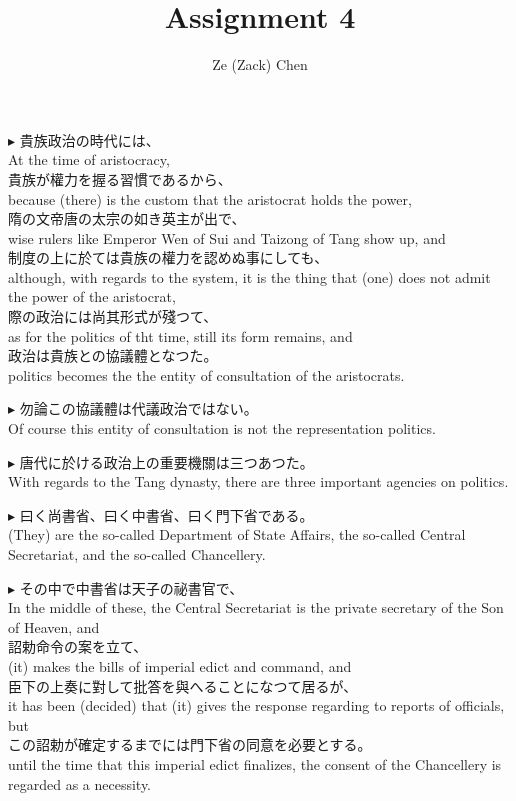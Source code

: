 \documentclass{ctexart}
\title{Assignment 4}
\author{Ze (Zack) Chen}
\makeatletter
\newcommand*{\shifttext}[1]{%
  \settowidth{\@tempdima}{#1}%
  \hspace{-\@tempdima}#1%
}
\newcommand{\plabel}[1]{%
\shifttext{\textbf{#1}\quad}%
}
\newcommand{\prule}{%
\begin{center}%
\hdashrule[0.5ex]{.99\linewidth}{1pt}{1pt 2.5pt}%
\end{center}%
}
\makeatother
\begin{document}
\maketitle

\plabel{$\blacktriangleright$}%
貴族政治の時代には、\\
At the time of aristocracy,\\
貴族が權力を握る習慣であるから、\\
because (there) is the custom that the aristocrat holds the power,\\
隋の文帝\textperiodcentered 唐の太宗の如き英主が出で、\\
wise rulers like Emperor Wen of Sui and Taizong of Tang show up, and\\
制度の上に於ては貴族の權力を認めぬ事にしても、\\
although, with regards to the system, it is the thing that (one) does not admit the power of the aristocrat,\\
際の政治には尚其形式が殘つて、\\
as for the politics of tht time, still its form remains, and\\
政治は貴族との協議體となつた。\\
politics becomes the the entity of consultation of the aristocrats.

\vspace{1em}
\plabel{$\blacktriangleright$}%
勿論この協議體は代議政治ではない。\\
Of course this entity of consultation is not the representation politics.

\prule

\plabel{$\blacktriangleright$}%
唐代に於ける政治上の重要機關は三つあつた。\\
With regards to the Tang dynasty, there are three important agencies on politics.

\vspace{1em}
\plabel{$\blacktriangleright$}%
曰く尚書省、曰く中書省、曰く門下省である。\\
(They) are the so-called Department of State Affairs, the so-called Central Secretariat, and the so-called Chancellery.

\vspace{1em}
\plabel{$\blacktriangleright$}%
その中で中書省は天子の祕書官で、\\
In the middle of these, the Central Secretariat is the private secretary of the Son of Heaven, and\\
詔勅命令の案を立て、\\
(it) makes the bills of imperial edict and command, and\\
臣下の上奏に對して批答を與へることになつて居るが、\\
it has been (decided) that (it) gives the response regarding to reports of officials, but\\
この詔勅が確定するまでには門下省の同意を必要とする。\\
until the time that this imperial edict finalizes, the consent of the Chancellery is regarded as a necessity.
\end{document}
